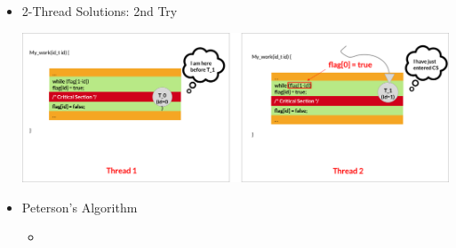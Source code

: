 \documentclass[12pt]{article}
\begin{document}
\begin{itemize}
    \item 2-Thread Solutions: 2nd Try


    \begin{center}
    \includegraphics[width=\linewidth]{images/week_2_notes_2_12.png}
    \end{center}

    \item Peterson's Algorithm

    \begin{itemize}
        \item
    \end{itemize}

\end{itemize}
\end{document}
